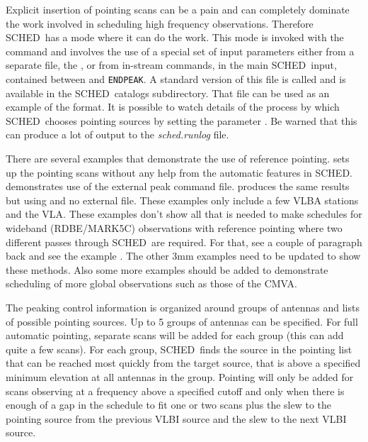 \documentclass{report}
\newcommand{\sched}{{\sc SCHED}}
\newcommand{\schedb}{{\sc SCHED~}}
\begin{document}
Explicit insertion of pointing scans can be a pain and can completely
dominate the work involved in scheduling high frequency observations.
Therefore \schedb has a mode where it can do the work.  This mode is
invoked with the  command and
involves the use of a special set of input parameters either from a
separate file, the , or from
in-stream commands, in the main \schedb input, contained between
 and {\tt ENDPEAK}.  A standard
version of this file is called  and is available in the
\schedb catalogs subdirectory.  That file can be used as an example of
the format.  It is possible to watch details of the process by which
\schedb chooses pointing sources by setting the parameter
.  Be warned that this can produce
a lot of output to the {\sl sched.runlog} file.

There are several examples that demonstrate the use of reference
pointing.  
sets up the pointing scans without any help from the automatic
features in \sched.   demonstrates use of the external
peak command file.   produces the same results but using
 and no external file.
These examples only include
a few VLBA stations and the VLA.  These examples don't show all that is
needed to make schedules for wideband (RDBE/MARK5C) observations with
reference pointing where two different passes through \schedb are 
required.  For that, see a couple of paragraph back and see the example 
.
The other 3mm examples need to be updated to show these methods.  Also
some more examples should be added to demonstrate
scheduling of more global observations such as those of the CMVA.

The peaking control information is organized around groups of antennas
and lists of possible pointing sources.  Up to 5 groups of antennas
can be specified.  For full automatic pointing, separate scans will be
added for each group (this can add quite a few scans).  For each
group, \schedb finds the source in the pointing list that can be
reached most quickly from the target source, that is above a specified
minimum elevation at all antennas in the group.  Pointing will only be
added for scans observing at a frequency above a specified cutoff and
only when there is enough of a gap in the schedule to fit one or two
scans plus the slew to the pointing source from the previous VLBI source
and the slew to the next VLBI source.
\end{document}
